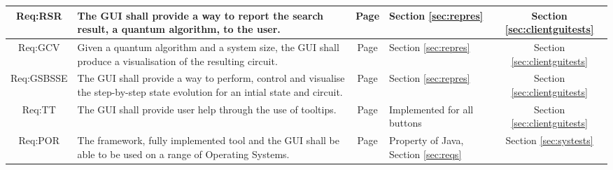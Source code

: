 \begin{landscape}
\begin{longtable}{|c|m{10cm}|c|m{4cm}|m{4cm}|}
Req:RSR &
The GUI shall provide a way to report the search result, a quantum algorithm, to the user. &
Page \pageref{sec:reqrsr} &
Section \ref{sec:repres} &
\multicolumn{1}{c|}{Section \ref{sec:clientguitests}} \\ \hline

Req:GCV &
Given a quantum algorithm and a system size, the GUI shall produce a visualisation of the resulting circuit. &
Page \pageref{sec:reqgcv} &
Section \ref{sec:repres} &
\multicolumn{1}{c|}{Section \ref{sec:clientguitests}} \\ \hline

Req:GSBSSE &
The GUI shall provide a way to perform, control and visualise the step-by-step state evolution for an intial state and circuit. &
Page \pageref{sec:reqgsbsse} &
Section \ref{sec:repres} &
\multicolumn{1}{c|}{Section \ref{sec:clientguitests}} \\ \hline

Req:TT &
The GUI shall provide user help through the use of tooltips. &
Page \pageref{sec:reqtt} &
Implemented for all buttons&
\multicolumn{1}{c|}{Section \ref{sec:clientguitests}} \\ \hline

Req:POR &
The framework, fully implemented tool and the GUI shall be able to be used on a range of Operating Systems. &
Page \pageref{sec:reqpor} &
Property of Java, Section \ref{sec:reqs} &
\multicolumn{1}{c|}{Section \ref{sec:systests}} \\ \hline

\end{longtable}
\end{landscape}
\clearpage